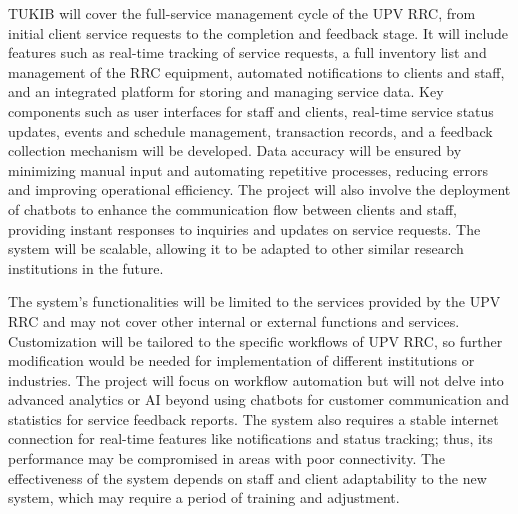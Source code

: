 TUKIB will cover the full-service management cycle of the UPV RRC, from initial client service requests to the completion and feedback stage. It will include features such as real-time tracking of service requests, a full inventory list and management of the RRC equipment, automated notifications to clients and staff, and an integrated platform for storing and managing service data. Key components such as user interfaces for staff and clients, real-time service status updates, events and schedule management, transaction records,  and a feedback collection mechanism will be developed. Data accuracy will be ensured by minimizing manual input and automating repetitive processes, reducing errors and improving operational efficiency. The project will also involve the deployment of chatbots to enhance the communication flow between clients and staff, providing instant responses to inquiries and updates on service requests. The system will be scalable, allowing it to be adapted to other similar research institutions in the future.

The system’s functionalities will be limited to the services provided by the UPV RRC and may not cover other internal or external functions and services. Customization will be tailored to the specific workflows of UPV RRC, so further modification would be needed for implementation of different institutions or industries. The project will focus on workflow automation but will not delve into advanced analytics or AI beyond using chatbots for customer communication and statistics for service feedback reports. The system also requires a stable internet connection for real-time features like notifications and status tracking; thus, its performance may be compromised in areas with poor connectivity. The effectiveness of the system depends on staff and client adaptability to the new system, which may require a period of training and adjustment.


\begin{comment}

%
%
Generally, one paragraph should be allotted for each of your research objectives.

Each paragraph contains a brief overview of the concept/theory and the purpose of doing the associated objective.

Each paragraph also includes a description of the scope/limitation of your study.

* Please refer to the slides for examples.

\end{comment}


